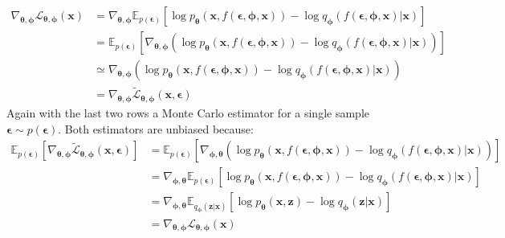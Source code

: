 \documentclass[12pt]{report}
\theoremstyle{definition}
\begin{document}
\begin{equation}
\begin{split}
\nabla_{\pmb{\theta}, \pmb{\phi}}\mathcal{L}_{\pmb{\theta}, \pmb{\phi}}(\mathbf{x})
& = \nabla_{\pmb{\theta}, \pmb{\phi}} \mathbb{E}_{p(\pmb{\epsilon})}\left[ \log p_{\pmb{\theta}}(\mathbf{x}, f(\pmb{\epsilon}, \pmb{\phi}, \mathbf{x})) - \log q_{\pmb{\phi}}(f(\pmb{\epsilon}, \pmb{\phi}, \mathbf{x})|\mathbf{x}) \right]	\\
& = \mathbb{E}_{p(\pmb{\epsilon})}\left[ \nabla_{\pmb{\theta}, \pmb{\phi}}(\log p_{\pmb{\theta}}(\mathbf{x}, f(\pmb{\epsilon}, \pmb{\phi}, \mathbf{x})) - \log q_{\pmb{\phi}}(f(\pmb{\epsilon}, \pmb{\phi}, \mathbf{x})|\mathbf{x})) \right]	\\
& \simeq \nabla_{\pmb{\theta}, \pmb{\phi}}(\log p_{\pmb{\theta}}(\mathbf{x}, f(\pmb{\epsilon}, \pmb{\phi}, \mathbf{x})) - \log q_{\pmb{\phi}}(f(\pmb{\epsilon}, \pmb{\phi}, \mathbf{x})|\mathbf{x})) \\
& = \nabla_{\pmb{\theta}, \pmb{\phi}}\tilde{\mathcal{L}}_{\pmb{\theta}, \pmb{\phi}}(\mathbf{x}, \pmb{\epsilon})
\end{split}
\end{equation}
Again with the last two rows a Monte Carlo estimator for a single sample $\pmb{\epsilon} \sim p(\pmb{\epsilon})$. Both estimators are unbiased because:
\begin{equation}
\begin{split}
\mathbb{E}_{p(\pmb{\epsilon})}\left[ \nabla_{\pmb{\theta}, \pmb{\phi}}\tilde{\mathcal{L}}_{\pmb{\theta}, \pmb{\phi}}(\mathbf{x}, \pmb{\epsilon}) \right]
& = \mathbb{E}_{p(\pmb{\epsilon})}\left[ \nabla_{\pmb{\phi}, \pmb{\theta}} (\log p_{\pmb{\theta}}(\mathbf{x}, f(\pmb{\epsilon}, \pmb{\phi}, \mathbf{x})) - \log q_{\pmb{\phi}}(f(\pmb{\epsilon}, \pmb{\phi}, \mathbf{x})|\mathbf{x})) \right] \\
& = \nabla_{\pmb{\phi}, \pmb{\theta}} \mathbb{E}_{p(\pmb{\epsilon})}\left[  \log p_{\pmb{\theta}}(\mathbf{x}, f(\pmb{\epsilon}, \pmb{\phi}, \mathbf{x})) - \log q_{\pmb{\phi}}(f(\pmb{\epsilon}, \pmb{\phi}, \mathbf{x})|\mathbf{x}) \right] \\
& = \nabla_{\pmb{\phi}, \pmb{\theta}} \mathbb{E}_{q_{\pmb{\phi}}(\mathbf{z}|\mathbf{x})}\left[  \log p_{\pmb{\theta}}(\mathbf{x}, \mathbf{z}) - \log q_{\pmb{\phi}}(\mathbf{z}|\mathbf{x}) \right] \\
& = \nabla_{\pmb{\theta}, \pmb{\phi}}\mathcal{L}_{\pmb{\theta}, \pmb{\phi}}(\mathbf{x})
\end{split}
\end{equation}
\end{document}
